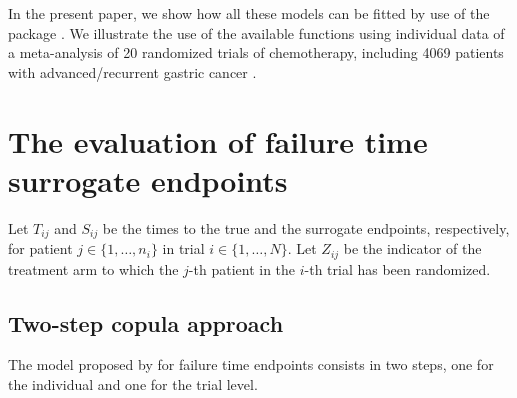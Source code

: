 \documentclass[article,shortnames, nojss]{jss}\usepackage[]{graphicx}\usepackage[]{color}
\begin{document}
In the present paper, we show how all these models can be fitted by use 
of the  \citep{R}
package  \citep{R:surrosurv}.
We illustrate the use of the available functions 
using individual data of a meta-analysis of 20 randomized trials of chemotherapy,
including 4069 patients with advanced/recurrent gastric cancer
\citep{GASTRIC13, Paoletti2013}.


\section{The evaluation of failure time surrogate endpoints}
\label{sec:methods}

Let $T_{ij}$ and $S_{ij}$ be the times to the true and the surrogate 
endpoints, respectively,
for patient $j\in\{1, \ldots, n_i\}$
in trial  $i\in\{1, \ldots, N\}$.
Let $Z_{ij}$ be the indicator of the treatment arm
to which the $j$-th patient in the $i$-th trial has been randomized.


\subsection{Two-step copula approach}
\label{sec:copulaApp}
The model proposed by \cite{BurzykowskiEtal01} for failure time endpoints
consists in two steps, one for the individual and one for the trial level.
\end{document}
